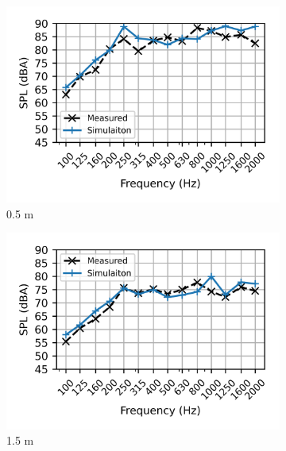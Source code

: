 \begin{figure}%
	\centering
	\begin{subfigure}[b]{0.49\textwidth}
		\centering
		\includegraphics{fig/chap5/initial_model/freq_spectrum/pos_10cm_0pt5m.png}
		\caption{0.5 m}
	\end{subfigure}
	\hfill
	\begin{subfigure}[b]{0.49\textwidth}
		\centering
		\includegraphics{fig/chap5/initial_model/freq_spectrum/pos_10cm_1pt5m.png}
		\caption{1.5 m}
	\end{subfigure}
	\begin{subfigure}[b]{0.49\textwidth}

\end{subfigure}
\end{figure}
